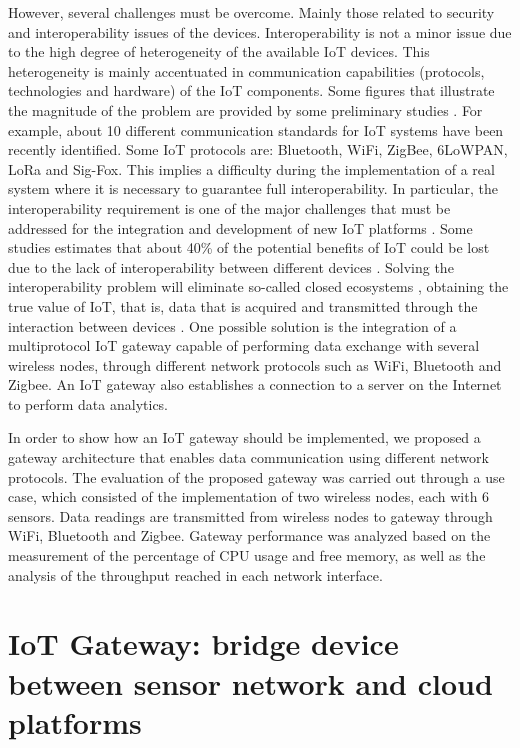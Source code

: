However, several challenges must be overcome. Mainly those related to security and interoperability issues of the devices. Interoperability is not a minor issue due to the high degree of heterogeneity of the available IoT devices. This heterogeneity is mainly accentuated in communication capabilities (protocols, technologies and hardware) of the IoT components. Some figures that illustrate the magnitude of the problem are provided by some preliminary studies \cite{Alvarado2018, alvarado_2017}. For example, about 10 different communication standards for IoT systems have been recently identified. Some IoT protocols are: Bluetooth, WiFi, ZigBee, 6LoWPAN, LoRa and Sig-Fox. This implies a difficulty during the implementation of a real system where it is necessary to guarantee full interoperability. In particular, the interoperability requirement is one of the major challenges that must be addressed for the integration and development of new IoT platforms \cite{Al-Fuqaha2015}. Some studies estimates that about 40\% of the potential benefits of IoT could be lost due to the lack of interoperability between different devices \cite{Manyika2015}. Solving the interoperability problem will eliminate so-called closed ecosystems \cite{Desai2015}, obtaining the true value of IoT, that is, data that is acquired and transmitted through the interaction between devices \cite{Evans2011}. One possible solution is the integration of a multiprotocol IoT gateway capable of performing data exchange with several wireless nodes, through different network protocols such as WiFi, Bluetooth and Zigbee. An IoT gateway also establishes a connection to a server on the Internet to perform data analytics. 

In order to show how an IoT gateway should be implemented, we proposed a gateway architecture that enables data communication using different network protocols. The evaluation of the proposed gateway was carried out through a use case, which consisted of the implementation of two wireless nodes, each with 6 sensors. Data readings are transmitted from wireless nodes to gateway through WiFi, Bluetooth and Zigbee. Gateway performance was analyzed based on the measurement of the percentage of CPU usage and free memory, as well as the analysis of the throughput reached in each network interface.	

\section{IoT Gateway: bridge device between sensor network and cloud platforms}
\label{sec:5.2}


